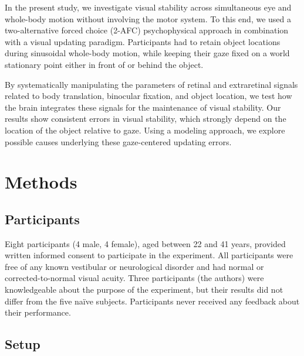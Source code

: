 In the present study, we investigate visual stability across simultaneous eye and whole-body motion without involving the motor system. To this end, we used a two-alternative forced choice (2-AFC) psychophysical approach in combination with a visual updating paradigm. Participants had to retain object locations during sinusoidal whole-body motion, while keeping their gaze fixed on a world stationary point either in front of or behind the object.

By systematically manipulating the parameters of retinal and extraretinal signals related to body translation, binocular fixation, and object location, we test how the brain integrates these signals for the maintenance of visual stability. Our results show consistent errors in visual stability, which strongly depend on the location of the object relative to gaze. Using a modeling approach, we explore possible causes underlying these gaze-centered updating errors.


\section{Methods}
\label{p2:sec:methods}

\subsection{Participants}

Eight participants (4 male, 4 female), aged between 22 and 41 years, provided written informed consent to participate in the experiment. All participants were free of any known vestibular or neurological disorder and had normal or corrected-to-normal visual acuity. Three participants (the authors) were knowledgeable about the purpose of the experiment, but their results did not differ from the five na\"ive subjects. Participants never received any feedback about their performance.

\subsection{Setup}

